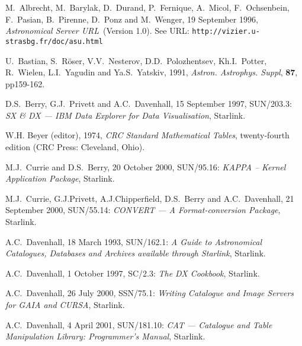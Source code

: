 \documentclass[twoside,11pt]{article}
\newcommand{\xref}[3]{#1}
\renewcommand{\_}{\texttt{\symbol{95}}}
\begin{document}


% 
\newpage
{}
\begin{thebibliography}{99}

   M.~Albrecht, M.~Barylak, D.~Durand, P.~Fernique,
   A.~Micol, F.~Ochsenbein, F.~Pasian, B.~Pirenne, D.~Ponz and
   M.~Wenger, 19 September 1996, {\it Astronomical Server URL}\,
   (Version 1.0).  See URL: {\tt http://vizier.u-strasbg.fr/doc/asu.html}

   U.~Bastian, S.~R\"{o}ser, V.V.~Nesterov, D.D.~Polozhentsev,
   Kh.I.~Potter, R.~Wielen, L.I.~Yagudin and Ya.S.~Yatskiv, 1991,
   {\it Astron. Astrophys. Suppl}, {\bf 87}, pp159-162.

   D.S.~Berry, G.J.~Privett and A.C.~Davenhall,
   15 September 1997, \xref{SUN/203.3}{sun203}{}: {\it SX \& DX ---
   IBM Data Explorer for Data Visualisation}, Starlink.

   W.H. Beyer (editor), 1974, {\it CRC Standard
   Mathematical Tables}, twenty-fourth edition (CRC Press: Cleveland,
   Ohio).

   M.J.~Currie and D.S.~Berry, 20 October 2000,
   \xref{SUN/95.16}{sun95}{}: {\it KAPPA -- Kernel Application Package},
   Starlink.

   M.J.~Currie, G.J.Privett, A.J.Chipperfield, D.S.~Berry
   and A.C.~Davenhall, 21 September 2000, \xref{SUN/55.14}{sun55}{}: {\it
   CONVERT --- A Format-conversion Package}, Starlink.

   A.C.~Davenhall, 18 March 1993, \xref{SUN/162.1}{sun162}{}:
   {\it A Guide to Astronomical Catalogues, Databases and Archives available
   through Starlink}, Starlink.

   A.C.~Davenhall, 1 October 1997, \xref{SC/2.3}{sc2}{}:
   {\it The DX Cookbook}, Starlink.

   A.C.~Davenhall, 26 July 2000,
   \xref{SSN/75.1}{ssn75}{}: {\it Writing Catalogue and Image Servers for
   GAIA and CURSA}, Starlink.

   A.C.~Davenhall, 4 April 2001,
   \xref{SUN/181.10}{sun181}{}: {\it CAT --- Catalogue and Table Manipulation
   Library: Programmer's Manual}, Starlink.


\end{thebibliography}
\end{document}
